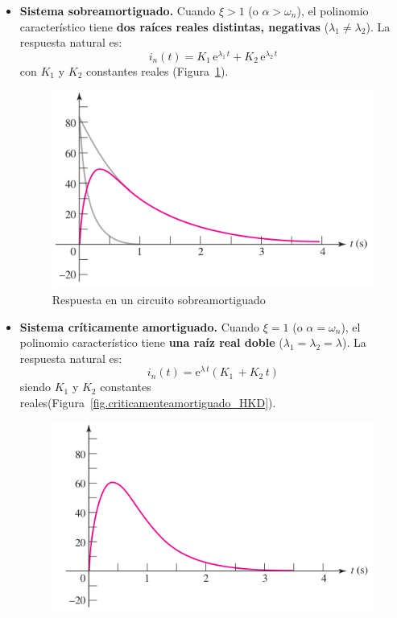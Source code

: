 \begin{itemize}
\item \textbf{Sistema sobreamortiguado.} Cuando $\xi>1$ (o
  $\alpha>\omega_n$), el polinomio característico tiene \textbf{dos
    raíces reales distintas, negativas} ($\lambda_1\neq\lambda_2$). La
  respuesta natural es:
  \begin{equation*}
    i_n(t)=K_1\,\mathrm{e}^{\lambda_1\,t}+K_2\,\mathrm{e}^{\lambda_2\,t}   
  \end{equation*}
  con $K_1$ y $K_2$ constantes reales
  (Figura~\ref{fig.sobreamortiguado_HKD}).
  \begin{figure}[H]
    \centering \includegraphics{../figs/Sobreamortiguado_HKD.pdf}
    \caption{Respuesta en un circuito sobreamortiguado}
    \label{fig.sobreamortiguado_HKD}
  \end{figure}
\item \textbf{Sistema críticamente amortiguado.} Cuando $\xi=1$ (o
  $\alpha=\omega_n$), el polinomio característico tiene \textbf{una
    raíz real doble} ($\lambda_1=\lambda_2=\lambda$). La respuesta
  natural es:
  \begin{equation*}
    i_n(t)=\mathrm{e}^{\lambda\,t}(K_1\,+K_2\,t)   
  \end{equation*}
  siendo $K_1$ y $K_2$ constantes
  reales(Figura~\ref{fig.criticamenteamortiguado_HKD}).
  \begin{figure}[H]
    \centering
    \includegraphics{../figs/AmortiguamientoCritico_HKD.pdf}

\end{figure}
\end{itemize}
